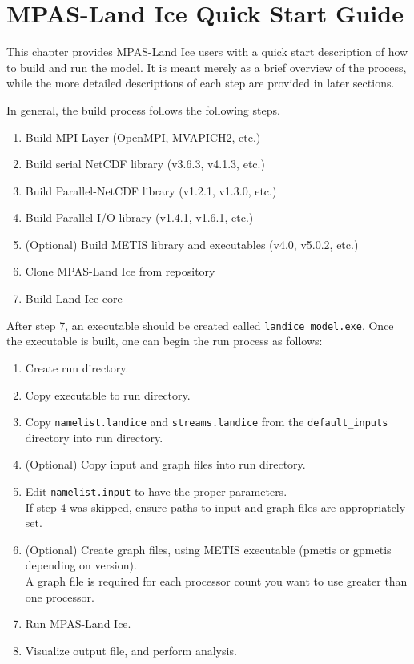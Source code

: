 \chapter{MPAS-Land Ice Quick Start Guide}
\label{chap:quick_start}

This chapter provides MPAS-Land Ice users with a quick start description of how to
build and run the model. It is meant merely as a brief overview of the process,
while the more detailed descriptions of each step are provided in later
sections.

In general, the build process follows the following steps.

\begin{enumerate}
	\item Build MPI Layer (OpenMPI, MVAPICH2, etc.)
	\item Build serial NetCDF library (v3.6.3, v4.1.3, etc.)
	\item Build Parallel-NetCDF library (v1.2.1, v1.3.0, etc.)
	\item Build Parallel I/O library (v1.4.1, v1.6.1, etc.)
	\item (Optional) Build METIS library and executables (v4.0, v5.0.2, etc.)
	\item Clone MPAS-Land Ice from repository
	\item Build Land Ice core
\end{enumerate}

After step 7, an executable should be created called {\tt landice\_model.exe}. Once the executable is built, one can begin the run process as follows:

\begin{enumerate}
	\item Create run directory.
	\item Copy executable to run directory.
	\item Copy {\tt namelist.landice} and {\tt streams.landice} from the {\tt default\_inputs} directory into run directory.
	\item (Optional) Copy input and graph files into run directory.
	\item Edit {\tt namelist.input} to have the proper parameters. \\
		  If step 4 was skipped, ensure paths to input and graph files are appropriately set.
	\item (Optional) Create graph files, using METIS executable (pmetis or gpmetis depending on version). \\
		  A graph file is required for each processor count you want to use greater than one processor.
	\item Run MPAS-Land Ice.
	\item Visualize output file, and perform analysis.
\end{enumerate}
